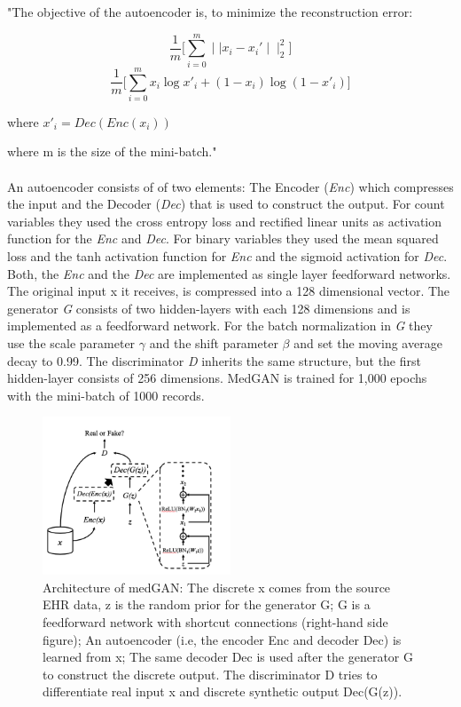 \documentclass[11pt, a4paper]{book}
\begin{document}
"The objective of the autoencoder is, to minimize the reconstruction error:

\begin{equation}
\frac{1}{m}\big[\sum_{i=0}^m \mid\mid x_i - x_i'\mid\mid_2^2]
\end{equation}
\begin{equation}
\frac{1}{m}\big[\sum_{i=0}^m x_i \log x'_i + (1-x_i) \log (1-x'_i)]
\end{equation} 
\begin{center}
where $x'_i = Dec(Enc(x_i))$
\end{center}

where m is the size of the mini-batch." \cite{Choi2017}
\\
\\
An autoencoder consists of of two elements: The Encoder (\textit{Enc}) which compresses the input and the Decoder (\textit{Dec}) that is used to construct the output.
For count variables they used the cross entropy loss and rectified linear units  as activation function for the \textit{Enc} and \textit{Dec}.
For binary variables they used the mean squared loss and the tanh activation function for \textit{Enc} and the sigmoid activation for \textit{Dec}.
Both, the \textit{Enc} and the \textit{Dec} are implemented as single layer feedforward networks. The original input x it receives, is compressed into a 128 dimensional vector. The generator \textit{G} consists of two hidden-layers with each 128 dimensions and is implemented as a feedforward network. For the batch normalization in \textit{G} they use the scale parameter  $\gamma$ and the shift parameter $\beta$ and set the moving average decay to 0.99. The discriminator \textit{D} inherits the same structure, but the first hidden-layer consists of 256 dimensions. MedGAN is trained for 1,000 epochs with the mini-batch of 1000 records. \cite{Choi2017}
\begin{figure}
  \begin{center}
  \includegraphics[width=0.5\textwidth]{img/medgan-architecture.png}
  \caption{Architecture of medGAN: The discrete x comes from the source EHR data, z is the random prior for the generator G; G is a feedforward network with shortcut connections (right-hand side figure); An autoencoder (i.e, the encoder Enc and decoder Dec) is learned from x; The same decoder Dec is used after the generator G to construct the discrete output. The discriminator D tries to differentiate real input x and discrete synthetic output Dec(G(z)).  \cite{Choi2017}}
  \label{fig:medgan-architecture}
  \end{center}
\end{figure}
\end{document}
